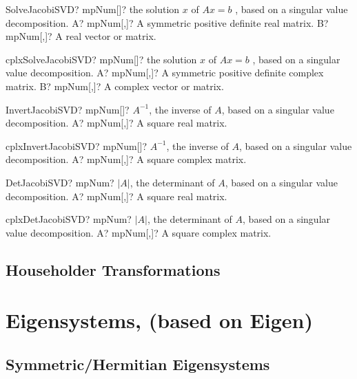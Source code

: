 \documentclass[12pt,a4paper,openany]{book}
\begin{document}
\begin{mpFunctionsExtract}
\mpFunctionTwo
{SolveJacobiSVD? mpNum[]? the solution $x$ of $A x = b$ , based on a singular value decomposition.}
{A? mpNum[,]? A symmetric positive definite real matrix.}
{B? mpNum[,]? A real vector or matrix.}
\end{mpFunctionsExtract}

\begin{mpFunctionsExtract}
\mpFunctionTwo
{cplxSolveJacobiSVD? mpNum[]? the solution $x$ of $A x = b$ , based on a singular value decomposition.}
{A? mpNum[,]? A symmetric positive definite complex matrix.}
{B? mpNum[,]? A complex vector or matrix.}
\end{mpFunctionsExtract}

\begin{mpFunctionsExtract}
\mpFunctionOne
{InvertJacobiSVD? mpNum[]? $A^{-1}$, the inverse of $A$, based on a singular value decomposition.}
{A? mpNum[,]? A square real matrix.}
\end{mpFunctionsExtract}

\begin{mpFunctionsExtract}
\mpFunctionOne
{cplxInvertJacobiSVD? mpNum[]? $A^{-1}$, the inverse of $A$, based on a singular value decomposition.}
{A? mpNum[,]? A square complex matrix.}
\end{mpFunctionsExtract}

\begin{mpFunctionsExtract}
\mpFunctionOne
{DetJacobiSVD? mpNum? $|A|$, the determinant of $A$, based on a singular value decomposition.}
{A? mpNum[,]? A square real matrix.}
\end{mpFunctionsExtract}

\begin{mpFunctionsExtract}
\mpFunctionOne
{cplxDetJacobiSVD? mpNum? $|A|$, the determinant of $A$, based on a singular value decomposition.}
{A? mpNum[,]? A square complex matrix.}
\end{mpFunctionsExtract}

\section{Householder Transformations}

\chapter{Eigensystems, (based on Eigen)}

\section{Symmetric/Hermitian Eigensystems}
\end{document}
